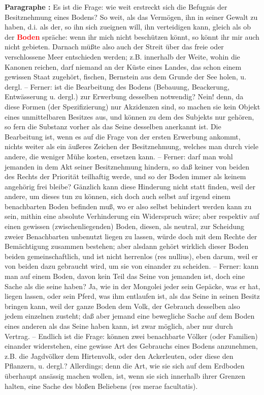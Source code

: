 \documentclass[a4paper,12pt,twoside]{book}
\newcommand{\match}[1]{\textcolor{red}{\textbf{#1}}}
\begin{document}
	\textbf{Paragraphe : }Es ist die Frage: wie weit erstreckt sich die Befugnis der Besitznehmung eines Bodens? So weit, als das Vermögen, ihn in seiner Gewalt zu haben, d.i. als der, so ihn sich zueignen will, ihn verteidigen kann, gleich als ob der \match{Boden} spräche: wenn ihr mich nicht beschützen könnt, so könnt ihr mir auch nicht gebieten. Darnach müßte also auch der Streit über das freie oder verschlossene Meer entschieden werden; z.B. innerhalb der Weite, wohin die Kanonen reichen, darf niemand an der Küste eines Landes, das schon einem gewissen  Staat zugehört, fischen, Bernstein aus dem Grunde der See holen, u. dergl. – Ferner: ist die Bearbeitung des Bodens (Bebauung, Beackerung, Entwässerung u. dergl.) zur Erwerbung desselben notwendig? Nein! denn, da diese Formen (der Spezifizierung) nur Akzidenzen sind, so machen sie kein Objekt eines unmittelbaren Besitzes aus, und können zu dem des Subjekts nur gehören, so fern die Substanz vorher als das Seine desselben anerkannt ist. Die Bearbeitung ist, wenn es auf die Frage von der ersten Erwerbung ankommt, nichts weiter als ein äußeres Zeichen der Besitznehmung, welches man durch viele andere, die weniger Mühe kosten, ersetzen kann. – Ferner: darf man wohl jemanden in dem Akt seiner Besitznehmung hindern, so daß keiner von beiden des Rechts der Priorität teilhaftig werde, und so der Boden immer als keinem angehörig frei bleibe? Gänzlich kann diese Hinderung nicht statt finden, weil der andere, um dieses tun zu können, sich doch auch selbst auf irgend einem benachbarten Boden befinden muß, wo er also selbst behindert werden kann zu sein, mithin eine absolute Verhinderung ein Widerspruch wäre; aber respektiv auf einen gewissen (zwischenliegenden) Boden, diesen, als neutral, zur Scheidung zweier Benachbarten unbenutzt liegen zu lassen, würde doch mit dem Rechte der Bemächtigung zusammen bestehen; aber alsdann gehört wirklich dieser Boden beiden gemeinschaftlich, und ist nicht herrenlos (res nullius), eben darum, weil er von beiden dazu gebraucht wird, um sie von einander zu scheiden. – Ferner: kann man auf einem Boden, davon kein Teil das Seine von jemanden ist, doch eine Sache als die seine haben? Ja, wie in der Mongolei jeder sein Gepäcke, was er hat, liegen lassen, oder sein Pferd, was ihm entlaufen ist, als das Seine in seinen Besitz bringen kann, weil der ganze Boden dem Volk, der Gebrauch desselben also jedem einzelnen zusteht; daß aber jemand eine bewegliche Sache auf dem Boden eines anderen als das Seine haben kann, ist zwar möglich, aber nur durch Vertrag. – Endlich ist die Frage: können zwei benachbarte  Völker (oder Familien) einander widerstehen, eine gewisse Art des Gebrauchs eines Bodens anzunehmen, z.B. die Jagdvölker dem Hirtenvolk, oder den Ackerleuten, oder diese den Pflanzern, u. dergl.? Allerdings; denn die Art, wie sie sich auf dem Erdboden überhaupt ansässig machen wollen, ist, wenn sie sich innerhalb ihrer Grenzen halten, eine Sache des bloßen Beliebens (res merae facultatis). 
	
\end{document}

